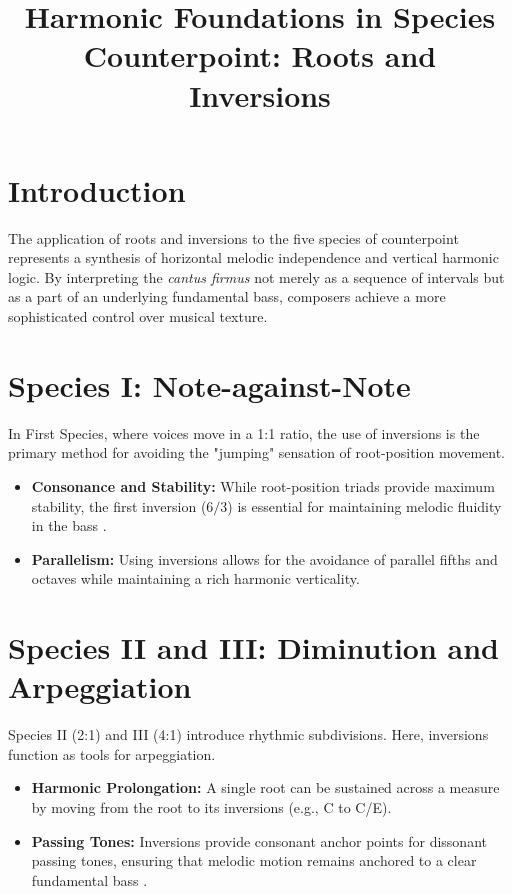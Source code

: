 \documentclass[11pt,a4paper]{article}
\title{Harmonic Foundations in Species Counterpoint: Roots and Inversions}
\author{}
\date{}
\begin{document}
\maketitle

\section{Introduction}
The application of roots and inversions to the five species of counterpoint represents a synthesis of horizontal melodic independence and vertical harmonic logic. By interpreting the \textit{cantus firmus} not merely as a sequence of intervals but as a part of an underlying fundamental bass, composers achieve a more sophisticated control over musical texture.

\section{Species I: Note-against-Note}
In First Species, where voices move in a 1:1 ratio, the use of inversions is the primary method for avoiding the "jumping" sensation of root-position movement.
\begin{itemize}
    \item \textbf{Consonance and Stability:} While root-position triads provide maximum stability, the first inversion ($6/3$) is essential for maintaining melodic fluidity in the bass \citep{fux1725}.
    \item \textbf{Parallelism:} Using inversions allows for the avoidance of parallel fifths and octaves while maintaining a rich harmonic verticality.
\end{itemize}

\section{Species II and III: Diminution and Arpeggiation}
Species II (2:1) and III (4:1) introduce rhythmic subdivisions. Here, inversions function as tools for arpeggiation.
\begin{itemize}
    \item \textbf{Harmonic Prolongation:} A single root can be sustained across a measure by moving from the root to its inversions (e.g., C to C/E).
    \item \textbf{Passing Tones:} Inversions provide consonant anchor points for dissonant passing tones, ensuring that melodic motion remains anchored to a clear fundamental bass \citep{schoenberg1911}.
\end{itemize}
\end{document}
